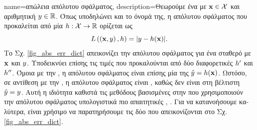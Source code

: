 {name={\foreignlanguage{greek}{απώλεια απόλυτου σφάλματος}},
	description={\foreignlanguage{greek}{Θεωρούμε ένα}  \foreignlanguage{greek}{με}  
		${\bf x} \in \mathcal{X}$ \foreignlanguage{greek}{και αριθμητική}  $y \in \mathbb{R}$. 
		\foreignlanguage{greek}{Όπως υποδηλώνει και το όνομά της, η}  \foreignlanguage{greek}{απόλυτου 
		σφάλματος} 
		\foreignlanguage{greek}{που προκαλείται από μία}  $h: \mathcal{X} \rightarrow \mathbb{R}$ 
		\foreignlanguage{greek}{ορίζεται ως} $$L\left(\left( {\bf x},y \right),h \right) = |y - h({\bf x})|.$$
		\foreignlanguage{greek}{Το Σχ.} \ref{fig_abs_err_dict} \foreignlanguage{greek}{απεικονίζει την}  
		\foreignlanguage{greek}{απόλυτου σφάλματος για ένα σταθερό}  \foreignlanguage{greek}{με} 
		 ${\bf x}$ \foreignlanguage{greek}{και}  $y$. 
		\foreignlanguage{greek}{Υποδεικνύει επίσης τις τιμές}  \foreignlanguage{greek}{που προκαλούνται 
		από δύο διαφορετικές}  $h'$ \foreignlanguage{greek}{και} $h''$. 
		\foreignlanguage{greek}{Όμοια με την} , \foreignlanguage{greek}{η}  
		\foreignlanguage{greek}{απόλυτου σφάλματος είναι επίσης μία}   
		\foreignlanguage{greek}{της}  $\hat{y}=h({\bf x})$. 
		\foreignlanguage{greek}{Ωστόσο, σε αντίθεση με την} , \foreignlanguage{greek}{η}  
		\foreignlanguage{greek}{απόλυτου σφάλματος είναι} , \foreignlanguage{greek}{καθώς δεν είναι}  
		 \foreignlanguage{greek}{στη βέλτιστη}  $\hat{y}=y$. 
		\foreignlanguage{greek}{Αυτή η ιδιότητα καθιστά τις μεθόδους βασισμένες στην}  
		\foreignlanguage{greek}{που χρησιμοποιούν την}  \foreignlanguage{greek}{απόλυτου σφάλματος 
		υπολογιστικά πιο απαιτητικές} \cite{nesterov04}, \cite{OptMLBook}. 
	    	\foreignlanguage{greek}{Για να κατανοήσουμε καλύτερα, είναι χρήσιμο να παρατηρήσουμε τις δύο}  
		\foreignlanguage{greek}{που απεικονίζονται στο Σχ.} \ref{fig_abs_err_dict}. 
}}
